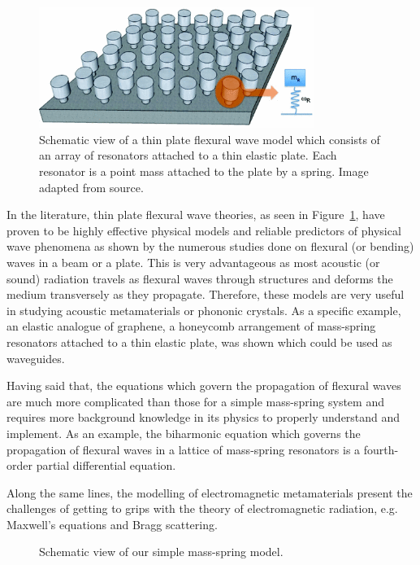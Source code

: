 \begin{figure}[!h]
\centering
\includegraphics[width=0.8\textwidth]{imgs/flexplate.png}
\caption{\label{fig:flexplate} Schematic view of a thin plate flexural wave
         model which consists of an array of resonators attached to a thin
         elastic plate. Each resonator is a point mass attached to the plate by
         a spring. Image adapted from source.\cite{graphene}}
\end{figure}

In the literature, thin plate flexural wave theories,\cite{graff,toelastic} as
seen in Figure~\ref{fig:flexplate}, have proven to be highly effective physical
models and reliable predictors of physical wave phenomena as shown by the
numerous studies done on flexural (or bending) waves in a beam or a
plate.\cite{flexbeam,graphene,mehulgeom} This is very advantageous as most
acoustic (or sound) radiation travels as flexural waves through structures and
deforms the medium transversely as they propagate.\cite{sound} Therefore, these
models are very useful in studying acoustic metamaterials or phononic
crystals.\cite{phonon} As a specific example, an elastic analogue of graphene,
a honeycomb arrangement of mass-spring resonators attached to a thin elastic
plate, was shown which could be used as waveguides.\cite{graphene}

Having said that, the equations which govern the propagation of flexural waves
are much more complicated than those for a simple mass-spring system and
requires more background knowledge in its physics to properly understand and
implement. As an example, the biharmonic equation which governs the propagation
of flexural waves in a lattice of mass-spring resonators is a fourth-order
partial differential equation.

Along the same lines, the modelling of electromagnetic metamaterials present
the challenges of getting to grips with the theory of electromagnetic
radiation, e.g. Maxwell's equations\cite{maxwell} and Bragg
scattering\cite{bragg}.

\begin{figure}
\centering
  \caption{\label{fig:ourmodel} Schematic view of our simple mass-spring model.}
\end{figure}


